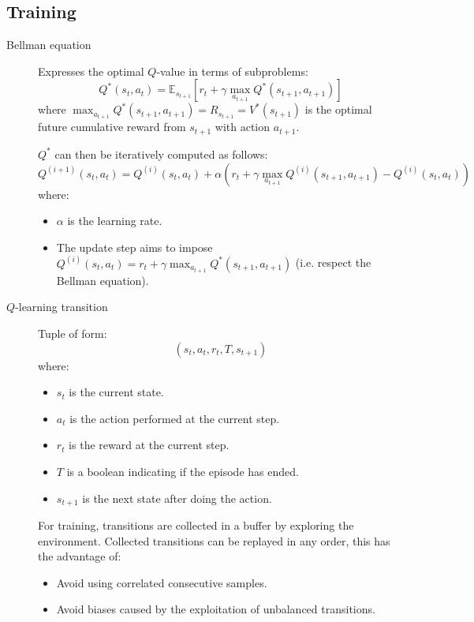 \subsection{Training}
\begin{description}
    \item[Bellman equation] 
        Expresses the optimal $Q$-value in terms of subproblems:
        \[ Q^*(s_t, a_t) = \mathbb{E}_{s_{t+1}} \left[ r_t + \gamma \max_{a_{t+1}} Q^*(s_{t+1}, a_{t+1}) \right] \]
        where $\max_{a_{t+1}} Q^*(s_{t+1}, a_{t+1}) = R_{s_{t+1}} = V^*(s_{t+1})$ is the optimal future cumulative reward from $s_{t+1}$ with action $a_{t+1}$.

        $Q^*$ can then be iteratively computed as follows:
        \[ Q^{(i+1)}(s_t, a_t) = Q^{(i)}(s_t, a_t) + \alpha\left( r_t + \gamma \max_{a_{t+1}} Q^{(i)}(s_{t+1}, a_{t+1}) - Q^{(i)}(s_t, a_t) \right) \]
        where:
        \begin{itemize}
            \item $\alpha$ is the learning rate.
            \item The update step aims to impose $Q^{(i)}(s_t, a_t) = r_t + \gamma \max_{a_{t+1}} Q^*(s_{t+1}, a_{t+1})$
                (i.e. respect the Bellman equation).
        \end{itemize}

    \item[$Q$-learning transition] 
        Tuple of form:
        \[ (s_t, a_t, r_t, T, s_{t+1}) \]
        where:
        \begin{itemize}
            \item $s_t$ is the current state.
            \item $a_t$ is the action performed at the current step.
            \item $r_t$ is the reward at the current step.
            \item $T$ is a boolean indicating if the episode has ended.
            \item $s_{t+1}$ is the next state after doing the action.
        \end{itemize}

        For training, transitions are collected in a buffer by exploring the environment.
        Collected transitions can be replayed in any order, this has the advantage of:
        \begin{itemize}
            \item Avoid using correlated consecutive samples.
            \item Avoid biases caused by the exploitation of unbalanced transitions.
        \end{itemize}


\end{description}
